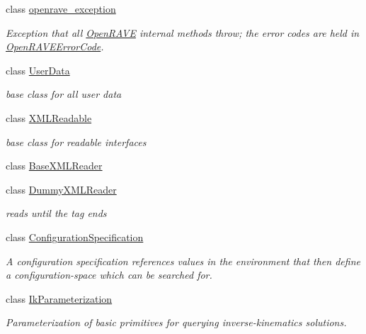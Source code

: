 \begin{DoxyCompactItemize}
class \hyperlink{classOpenRAVE_1_1openrave__exception}{openrave\_\-exception}
\begin{DoxyCompactList}\small\item\em Exception that all \hyperlink{namespaceOpenRAVE}{OpenRAVE} internal methods throw; the error codes are held in \hyperlink{namespaceOpenRAVE_adf2fa050995e80f643f8eddc14d7262c}{OpenRAVEErrorCode}. \item\end{DoxyCompactList}\item 
class \hyperlink{classOpenRAVE_1_1UserData}{UserData}
\begin{DoxyCompactList}\small\item\em base class for all user data \item\end{DoxyCompactList}\item 
class \hyperlink{classOpenRAVE_1_1XMLReadable}{XMLReadable}
\begin{DoxyCompactList}\small\item\em base class for readable interfaces \item\end{DoxyCompactList}\item 
class \hyperlink{classOpenRAVE_1_1BaseXMLReader}{BaseXMLReader}
\item 
class \hyperlink{classOpenRAVE_1_1DummyXMLReader}{DummyXMLReader}
\begin{DoxyCompactList}\small\item\em reads until the tag ends \item\end{DoxyCompactList}\item 
class \hyperlink{classOpenRAVE_1_1ConfigurationSpecification}{ConfigurationSpecification}
\begin{DoxyCompactList}\small\item\em A configuration specification references values in the environment that then define a configuration-\/space which can be searched for. \item\end{DoxyCompactList}\item 
class \hyperlink{classOpenRAVE_1_1IkParameterization}{IkParameterization}
\begin{DoxyCompactList}\small\item\em Parameterization of basic primitives for querying inverse-\/kinematics solutions. \item\end{DoxyCompactList}\item 

\end{DoxyCompactItemize}
